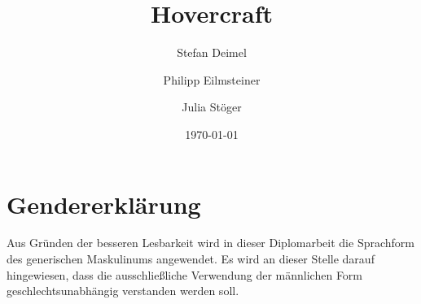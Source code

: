 \documentclass[paper=a4,12pt]{scrreprt}
\title{Hovercraft}
\author{Stefan Deimel \and Philipp Eilmsteiner \and Julia Stöger}
\date{\today}
\begin{document}
\listoftodos

\frontmatter

\maketitle


\begin{Eid}%
\end{Eid}\newpage
\def\chapterpagestyle{headings} 
\chapter*{Gendererklärung}
Aus Gründen der besseren Lesbarkeit wird in dieser Diplomarbeit die Sprachform des generischen Maskulinums angewendet. Es wird an dieser Stelle darauf hingewiesen, dass die ausschließliche Verwendung der männlichen Form geschlechtsunabhängig verstanden werden soll.
\newpage













\def\chapterpagestyle{headings} 
\tableofcontents
\end{document}
